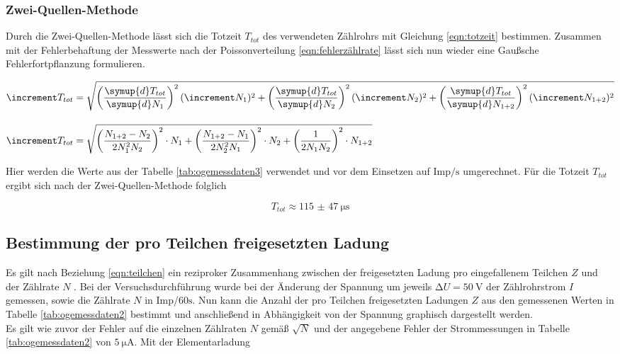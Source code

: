 \subsubsection{Zwei-Quellen-Methode}
Durch die Zwei-Quellen-Methode lässt sich die Totzeit $T_{tot}$ des verwendeten Zählrohrs mit Gleichung \eqref{eqn:totzeit} bestimmen.
Zusammen mit der Fehlerbehaftung der Messwerte nach der Poissonverteilung \eqref{eqn:fehlerzählrate} lässt sich nun wieder eine
Gaußsche Fehlerfortpflanzung formulieren.

\begin{align*}
\increment T_{tot} &= \sqrt{\left( \frac{\symup{d}T_{tot}}{\symup{d}N_{1}}\right)^{2} (\increment N_{1})^{2}
+\left( \frac{\symup{d}T_{tot}}{\symup{d}N_{2}}\right)^{2} (\increment N_{2})^{2}
+\left( \frac{\symup{d}T_{tot}}{\symup{d}N_{1+2}}\right)^{2} (\increment N_{1+2})^{2}
} \\[1em]
\increment T_{tot} &= \sqrt{\left( \frac{N_{1+2} - N_{2}}{2 N_{1}^{2} N_{2}}\right)^2 \cdot N_{1} 
+\left( \frac{N_{1+2} - N_{1}}{2 N_{2}^{2} N_{1}}\right)^2 \cdot N_{2}
+\left( \frac{1}{2 N_{1} N_{2}}\right)^2 \cdot N_{1+2}} 
\end{align*}

Hier werden die Werte aus der Tabelle \ref{tab:ogemessdaten3} verwendet und vor dem Einsetzen auf $\text{Imp} / \si{\second}$ umgerechnet.
Für die Totzeit $T_{tot}$ ergibt sich nach der Zwei-Quellen-Methode folglich

\begin{equation}
T_{tot} \approx \SI{115(47)}{\micro\second}
\end{equation}

\subsection{Bestimmung der pro Teilchen freigesetzten Ladung}

Es gilt nach Beziehung \eqref{eqn:teilchen} ein reziproker Zusammenhang zwischen der freigesetzten Ladung pro eingefallenem Teilchen $Z$ und der
Zählrate $N$ . Bei der Versuchsdurchführung wurde bei der Änderung der Spannung um jeweils $\increment U = \SI{50}{\volt}$ der Zählrohrstrom $I$ gemessen, sowie die Zählrate
$N$ in $\text{Imp}$/$60\si{\second}$. Nun kann die Anzahl der pro Teilchen freigesetzten Ladungen $Z$ aus den gemessenen Werten in Tabelle \ref{tab:ogemessdaten2} bestimmt und anschließend
in Abhängigkeit von der Spannung graphisch dargestellt werden.
\newline
\\
Es gilt wie zuvor der Fehler auf die einzelnen Zählraten $N$ gemäß $\sqrt{N}$ und der angegebene Fehler der Strommessungen in Tabelle \ref{tab:ogemessdaten2} von $\SI{5}{\micro\ampere}$.
Mit der Elementarladung

